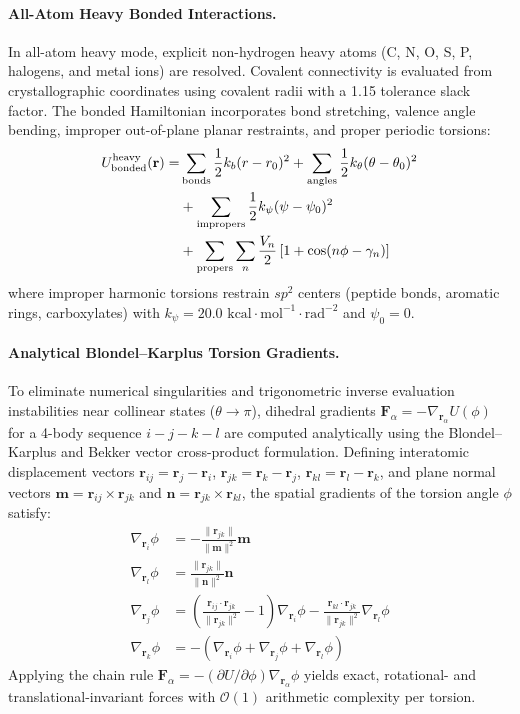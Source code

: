 \documentclass[journal=jpcbfk,manuscript=article]{achemso}
\begin{document}
\paragraph{All-Atom Heavy Bonded Interactions.}
In all-atom heavy mode, explicit non-hydrogen heavy atoms (C, N, O, S, P, halogens, and metal ions) are resolved. Covalent connectivity is evaluated from crystallographic coordinates using covalent radii with a 1.15 tolerance slack factor. The bonded Hamiltonian incorporates bond stretching, valence angle bending, improper out-of-plane planar restraints, and proper periodic torsions:\cite{maier2015ff14sb,case2005amber}
\begin{align}
U_{\rm bonded}^{\rm heavy}(\mathbf{r}) = &\sum_{\rm bonds} \frac{1}{2} k_b (r - r_0)^2 + \sum_{\rm angles} \frac{1}{2} k_\theta (\theta - \theta_0)^2 \nonumber \\
&+ \sum_{\rm impropers} \frac{1}{2} k_\psi (\psi - \psi_0)^2 \nonumber \\
&+ \sum_{\rm propers} \sum_{n} \frac{V_n}{2} \left[ 1 + \cos(n\phi - \gamma_n) \right]
\end{align}
where improper harmonic torsions restrain $sp^2$ centers (peptide bonds, aromatic rings, carboxylates) with $k_\psi = 20.0\text{ kcal}\cdot\text{mol}^{-1}\cdot\text{rad}^{-2}$ and $\psi_0 = 0$.

\paragraph{Analytical Blondel--Karplus Torsion Gradients.}
To eliminate numerical singularities and trigonometric inverse evaluation instabilities near collinear states ($\theta \to \pi$), dihedral gradients $\mathbf{F}_\alpha = -\nabla_{\mathbf{r}_\alpha} U(\phi)$ for a 4-body sequence $i-j-k-l$ are computed analytically using the Blondel--Karplus and Bekker vector cross-product formulation.\cite{blondel1991new,bekker1995force} Defining interatomic displacement vectors $\mathbf{r}_{ij} = \mathbf{r}_j - \mathbf{r}_i$, $\mathbf{r}_{jk} = \mathbf{r}_k - \mathbf{r}_j$, $\mathbf{r}_{kl} = \mathbf{r}_l - \mathbf{r}_k$, and plane normal vectors $\mathbf{m} = \mathbf{r}_{ij} \times \mathbf{r}_{jk}$ and $\mathbf{n} = \mathbf{r}_{jk} \times \mathbf{r}_{kl}$, the spatial gradients of the torsion angle $\phi$ satisfy:
\begin{align}
\nabla_{\mathbf{r}_i}\phi &= -\frac{\|\mathbf{r}_{jk}\|}{\|\mathbf{m}\|^2} \mathbf{m} \\
\nabla_{\mathbf{r}_l}\phi &= \frac{\|\mathbf{r}_{jk}\|}{\|\mathbf{n}\|^2} \mathbf{n} \\
\nabla_{\mathbf{r}_j}\phi &= \left( \frac{\mathbf{r}_{ij}\cdot\mathbf{r}_{jk}}{\|\mathbf{r}_{jk}\|^2} - 1 \right) \nabla_{\mathbf{r}_i}\phi - \frac{\mathbf{r}_{kl}\cdot\mathbf{r}_{jk}}{\|\mathbf{r}_{jk}\|^2} \nabla_{\mathbf{r}_l}\phi \\
\nabla_{\mathbf{r}_k}\phi &= - \left( \nabla_{\mathbf{r}_i}\phi + \nabla_{\mathbf{r}_j}\phi + \nabla_{\mathbf{r}_l}\phi \right)
\end{align}
Applying the chain rule $\mathbf{F}_\alpha = -(\partial U / \partial \phi)\nabla_{\mathbf{r}_\alpha}\phi$ yields exact, rotational- and translational-invariant forces with $\mathcal{O}(1)$ arithmetic complexity per torsion.
\end{document}
